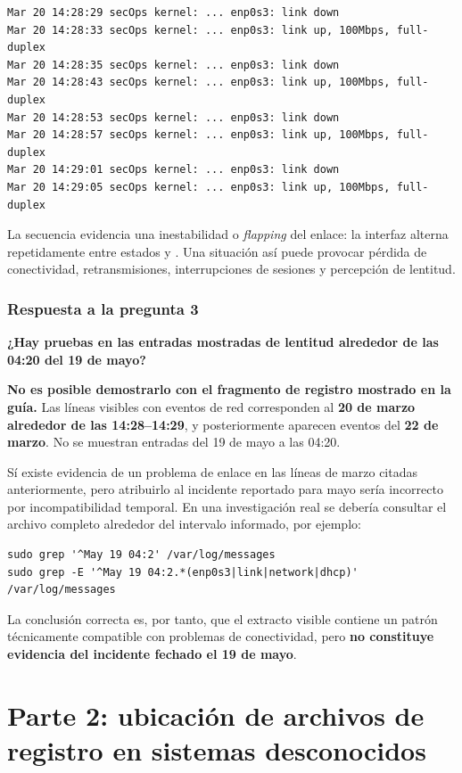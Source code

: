 \documentclass[11pt,a4paper]{article}
\newcommand{\cmd}[1]{\texttt{\detokenize{#1}}}
\begin{document}
\begin{lstlisting}[style=terminal]
Mar 20 14:28:29 secOps kernel: ... enp0s3: link down
Mar 20 14:28:33 secOps kernel: ... enp0s3: link up, 100Mbps, full-duplex
Mar 20 14:28:35 secOps kernel: ... enp0s3: link down
Mar 20 14:28:43 secOps kernel: ... enp0s3: link up, 100Mbps, full-duplex
Mar 20 14:28:53 secOps kernel: ... enp0s3: link down
Mar 20 14:28:57 secOps kernel: ... enp0s3: link up, 100Mbps, full-duplex
Mar 20 14:29:01 secOps kernel: ... enp0s3: link down
Mar 20 14:29:05 secOps kernel: ... enp0s3: link up, 100Mbps, full-duplex
\end{lstlisting}

La secuencia evidencia una inestabilidad o \emph{flapping} del enlace: la interfaz alterna repetidamente entre estados \cmd{down} y \cmd{up}. Una situación así puede provocar pérdida de conectividad, retransmisiones, interrupciones de sesiones y percepción de lentitud.

\subsubsection*{Respuesta a la pregunta 3}
\textbf{¿Hay pruebas en las entradas mostradas de lentitud alrededor de las 04:20 del 19 de mayo?}

\textbf{No es posible demostrarlo con el fragmento de registro mostrado en la guía.} Las líneas visibles con eventos de red corresponden al \textbf{20 de marzo alrededor de las 14:28--14:29}, y posteriormente aparecen eventos del \textbf{22 de marzo}. No se muestran entradas del 19 de mayo a las 04:20.

Sí existe evidencia de un problema de enlace en las líneas de marzo citadas anteriormente, pero atribuirlo al incidente reportado para mayo sería incorrecto por incompatibilidad temporal. En una investigación real se debería consultar el archivo completo alrededor del intervalo informado, por ejemplo:

\begin{lstlisting}[style=terminal]
sudo grep '^May 19 04:2' /var/log/messages
sudo grep -E '^May 19 04:2.*(enp0s3|link|network|dhcp)' /var/log/messages
\end{lstlisting}

La conclusión correcta es, por tanto, que el extracto visible contiene un patrón técnicamente compatible con problemas de conectividad, pero \textbf{no constituye evidencia del incidente fechado el 19 de mayo}.

\section{Parte 2: ubicación de archivos de registro en sistemas desconocidos}
\end{document}
